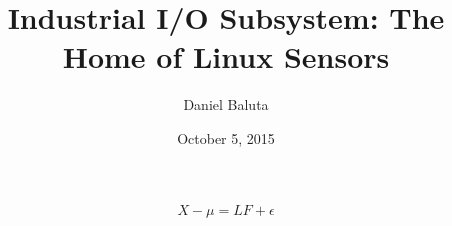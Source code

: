 \documentclass[aspectratio=169]{beamer}
\title[Industrial I/O]{Industrial I/O Subsystem: The Home of Linux Sensors} %
\author{Daniel Baluta} %
\institute[Intel] %
{
Intel \\ %
\medskip
\textit{daniel.baluta@intel.com} %

}
\date{October 5, 2015} %
\begin{document}
\begin{frame}
\titlepage %
\end{frame}

\begin{frame}
\begin{equation*}
X - \mu = L F + \epsilon
\end{equation*}
\end{frame}





\end{document}
